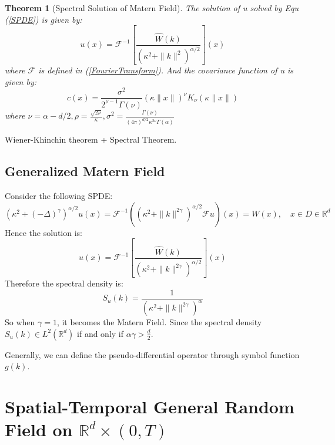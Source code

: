 \documentclass{article}
\newtheorem{theorem}{Theorem}
\begin{document}
\begin{theorem}[Spectral Solution of Matern Field]\label{spectral_solution_matern}
	The solution of u solved by Equ (\ref{SPDE}) is given by:
	\begin{equation}
		u(x) = \mathcal{F}^{-1}\left[\frac{\hat{W}(k)}{(\kappa^2 + \|k\|^2)^{\alpha/2}}\right](x)
	\end{equation}
	where $\mathcal{F}$ is defined in (\ref{FourierTransform}).
	And the covariance function of u is given by:
	\begin{equation}
		c(x) = \frac{\sigma^2}{2^{\nu -1}\Gamma(\nu)}(\kappa \|x\|)^\nu K_\nu (\kappa \|x\|)
	\end{equation}
	where $\nu = \alpha - d/2, \rho = \frac{\sqrt{2\nu}}{\kappa}, \sigma^2 = \frac{\Gamma(\nu)}{(4\pi)^{d/2}\kappa^{2\nu}\Gamma(\alpha) }$
\end{theorem}



Wiener-Khinchin theorem + Spectral Theorem.
\subsection{Generalized Matern Field}
Consider the following SPDE:
\begin{equation}\label{GWM}
	(\kappa^2 +(- \Delta)^{\gamma})^{\alpha/2}u(x)=\mathcal{F}^{-1}\left((\kappa^2 + \|k\|^{2\gamma})^{\alpha/2}\mathcal{F}u\right)(x) = W(x), \quad x\in D\in \mathbb{R}^d
\end{equation}
Hence the solution is:
\begin{equation}
	u(x)=\mathcal{F}^{-1}\left[\frac{\hat{W}(k)}{(\kappa^2 + \|k\|^{2\gamma})^{\alpha/2}}\right](x)
\end{equation}
Therefore the spectral density is:
\begin{equation}
	S_u(k)=\frac{1}{(\kappa^2 + \|k\|^{2\gamma})^{\alpha}}
\end{equation}
So when $\gamma = 1$, it becomes the Matern Field. Since  the spectral density $S_u(k)\in L^2(\mathbb{R}^d)$ if and only if $\alpha \gamma > \frac{d}{2}$.

Generally, we can define the pseudo-differential operator through symbol function $g(k)$.
\section{Spatial-Temporal General Random Field on $\mathbb{R}^d\times (0, T)$}
\end{document}
